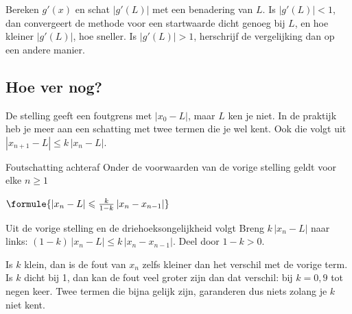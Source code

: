 \begin{werkwijze}
Bereken $g'(x)$ en schat $|g'(L)|$ met een benadering van $L$. Is $|g'(L)| < 1$, dan convergeert de methode voor een startwaarde dicht genoeg bij $L$, en hoe kleiner $|g'(L)|$, hoe sneller. Is $|g'(L)| > 1$, herschrijf de vergelijking dan op een andere manier.
\end{werkwijze}


\begin{oefeningen}
\end{oefeningen}

\subsection{Hoe ver nog?}

De stelling geeft een foutgrens met $|x_0 - L|$, maar $L$ ken je niet. In de praktijk heb je meer aan een schatting met twee termen die je wel kent. Ook die volgt uit $|x_{n+1} - L| \leqslant k\,|x_n - L|$.

\begin{theorie}
\begin{stelling}{Foutschatting achteraf}
Onder de voorwaarden van de vorige stelling geldt voor elke $n \geqslant 1$

\vspace{1mm}
\qquad $\formule{|x_n - L| \leqslant \frac{k}{1 - k}\,|x_n - x_{n-1}|}$
\end{stelling}

\begin{bewijs}
Uit de vorige stelling en de driehoeksongelijkheid volgt
Breng $k\,|x_n - L|$ naar links: $(1 - k)\,|x_n - L| \leqslant k\,|x_n - x_{n-1}|$. Deel door $1 - k > 0$.
\end{bewijs}
\end{theorie}

Is $k$ klein, dan is de fout van $x_n$ zelfs kleiner dan het verschil met de vorige term. Is $k$ dicht bij 1, dan kan de fout veel groter zijn dan dat verschil: bij $k = 0{,}9$ tot negen keer. Twee termen die bijna gelijk zijn, garanderen dus niets zolang je $k$ niet kent.

